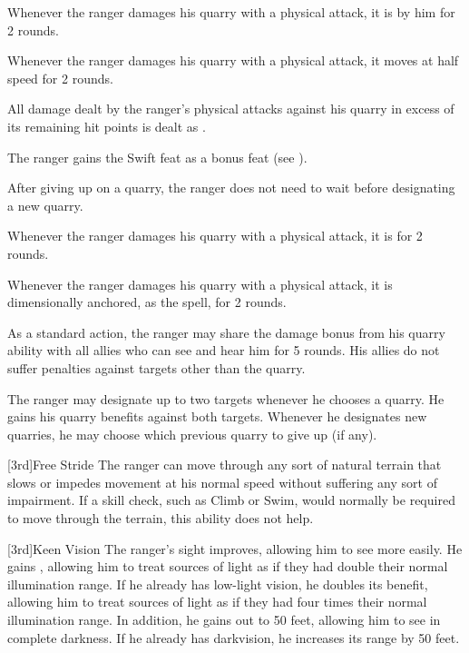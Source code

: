         Whenever the ranger damages his quarry with a physical attack, it is \goaded by him for 2 rounds.

        Whenever the ranger damages his quarry with a physical attack, it moves at half speed for 2 rounds.

        All damage dealt by the ranger's physical attacks against his quarry in excess of its remaining hit points is dealt as .

        The ranger gains the Swift feat as a bonus feat (see ).

        After giving up on a quarry, the ranger does not need to wait before designating a new quarry.

        Whenever the ranger damages his quarry with a physical attack, it is \impaired for 2 rounds.

        Whenever the ranger damages his quarry with a physical attack, it is dimensionally anchored, as the  spell, for 2 rounds.

        As a standard action, the ranger may share the damage bonus from his quarry ability with all allies who can see and hear him for 5 rounds.
        His allies do not suffer penalties against targets other than the quarry.

        The ranger may designate up to two targets whenever he chooses a quarry.
        He gains his quarry benefits against both targets.
        Whenever he designates new quarries, he may choose which previous quarry to give up (if any).

        [3rd]{Free Stride}
        The ranger can move through any sort of natural terrain that slows or impedes movement at his normal speed without suffering any sort of impairment.
        If a skill check, such as Climb or Swim, would normally be required to move through the terrain, this ability does not help.

        [3rd]{Keen Vision}
        The ranger's sight improves, allowing him to see more easily.
        He gains , allowing him to treat sources of light as if they had double their normal illumination range.
        If he already has low-light vision, he doubles its benefit, allowing him to treat sources of light as if they had four times their normal illumination range.
        In addition, he gains  out to 50 feet, allowing him to see in complete darkness.
        If he already has darkvision, he increases its range by 50 feet.

